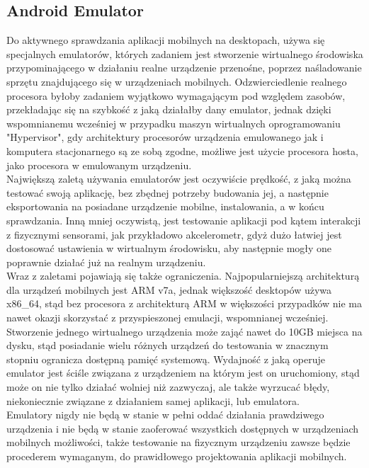 \documentclass[12pt, a4paper]{article}
\begin{document}
\begin{sloppypar}
{  \subsection{Android Emulator}
  {
    Do aktywnego sprawdzania aplikacji mobilnych na desktopach, używa się
    specjalnych emulatorów, których zadaniem jest stworzenie wirtualnego środowiska
    przypominającego w działaniu realne urządzenie przenośne, poprzez naśladowanie
    sprzętu znajdującego się w urządzeniach mobilnych. Odzwierciedlenie realnego
    procesora byłoby zadaniem wyjątkowo wymagającym pod względem zasobów,
    przekładając się na szybkość z jaką działałby dany emulator, jednak dzięki wspomnianemu
    wcześniej w przypadku maszyn wirtualnych oprogramowaniu "Hypervisor", gdy architektury
    procesorów urządzenia emulowanego jak i komputera stacjonarnego są ze sobą zgodne,
    możliwe jest użycie procesora hosta, jako procesora w emulowanym urządzeniu.\\
    Największą zaletą używania emulatorów jest oczywiście prędkość, z jaką można testować
    swoją aplikację, bez zbędnej potrzeby budowania jej, a następnie eksportowania
    na posiadane urządzenie mobilne, instalowania, a w końcu sprawdzania. Inną mniej
    oczywistą, jest testowanie aplikacji pod kątem interakcji z fizycznymi
    sensorami, jak przykładowo akcelerometr, gdyż dużo łatwiej jest dostosować ustawienia
    w wirtualnym środowisku, aby następnie mogły one poprawnie działać już na realnym
    urządzeniu.\\
    Wraz z zaletami pojawiają się także ograniczenia. Najpopularniejszą architekturą
    dla urządzeń mobilnych jest ARM v7a, jednak większość desktopów używa x86\_64, stąd
    bez procesora z architekturą ARM w większości przypadków nie ma nawet okazji skorzystać
    z przyspieszonej emulacji, wspomnianej wcześniej. Stworzenie jednego wirtualnego
    urządzenia może zająć nawet do 10GB miejsca na dysku, stąd posiadanie wielu różnych
    urządzeń do testowania w znacznym stopniu ogranicza dostępną pamięć systemową.
    Wydajność z jaką operuje emulator jest ściśle związana z urządzeniem na którym jest
    on uruchomiony, stąd może on nie tylko działać wolniej niż zazwyczaj, ale także
    wyrzucać błędy, niekoniecznie związane z działaniem samej aplikacji, lub emulatora.\\
    Emulatory nigdy nie będą w stanie w pełni oddać działania prawdziwego urządzenia i
    nie będą w stanie zaoferować wszystkich dostępnych w urządzeniach mobilnych możliwości,
    także testowanie na fizycznym urządzeniu zawsze będzie procederem wymaganym, do
    prawidłowego projektowania aplikacji mobilnych.
  }
}
\end{sloppypar}
\end{document}
